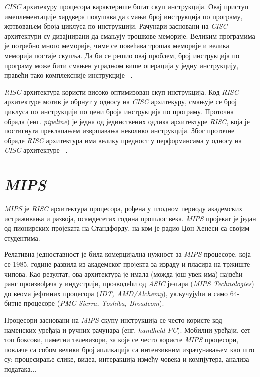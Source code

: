 \documentclass[12pt,oneside]{memoir}
\begin{document}
\indent \textit{CISC} архитекуру процесора карактерише богат скуп инструкција. Овај приступ имеплементације хардвера покушава да смањи број инструкција по програму, жртвовањем броја циклуса по инструкцији. Рачунари засновани на \textit{CISC} архитектури су дизајнирани да смањују трошкове меморије. Великим програмима је потребно много меморије, чиме се повећава трошак меморије и велика меморија постаје скупља. Да би се решио овај проблем, број инструкција по програму може бити смањен уградњом више операција у једну инструкцију, правећи тако комплексније инструкције ~\cite{rcRef}.

\indent \textit{RISC} архитектура користи високо оптимизован скуп инструкција. Код \textit{RISC} архитектуре мотив је обрнут у односу на \textit{CISC} архитекуру, смањује се број циклуса по инструкцији по цени броја инструкција по програму. Проточна обрада (енг. \textit{pipeline}) је једна од јединствених одлика архитектуре \textit{RISC}, која је постигнута преклапањем извршавања неколико инструкција. Због проточне обраде \textit{RISC} архитектура има велику предност у перформансама у односу на \textit{CISC} архитектуре ~\cite{rcRef}.



\section{\textit{MIPS}}
\label{sec_mips}

\indent \textit{MIPS} је \textit{RISC} архитектура процесора, рођена у плодном периоду академских истраживања и развоја, осамдесетих година прошлог века. \textit{MIPS} пројекат је један од пионирских пројеката на Стандфорду, на ком је радио Џон Хенеси са својим студентима.

\indent Релативна једноставност је била комерцијална нужност за \textit{MIPS} процесоре, која се 1985. године развила из академског пројекта за израду и пласира на тржиште чипова. Као резултат, ова архитектура је имала (можда још увек има) највећи ранг произвођача у индустрији, прозводећи од \textit{ASIC} језгара (\textit{MIPS Technologies}) до веома јефтиних процесора (\textit{IDT, AMD/Alchemy}), укључујући и само 64-битне процесоре (\textit{PMC-Sierra, Toshiba, Broadcom}).

\indent Процесори засновани на \textit{MIPS} скупу инструкција се често користе код наменских уређаја и ручних рачунара (енг. \textit{handheld PC}). Мобилни уређаји, сет-топ боксови, паметни телевизори, за које се често користе \textit{MIPS} процесори, повлаче са собом велики број апликација са интензивним израчунавањем као што су: процесирање слике, видеа, интеракција између човека и компјутера, анализа података...
\end{document}
